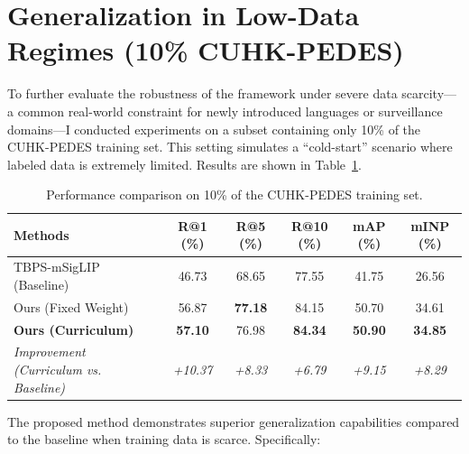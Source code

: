 \documentclass[../main.tex]{subfiles}
\begin{document}
\section{Generalization in Low-Data Regimes (10\% CUHK-PEDES)}

\noindent To further evaluate the robustness of the framework under severe data scarcity---a common real-world constraint for newly introduced languages or surveillance domains---I conducted experiments on a subset containing only 10\% of the CUHK-PEDES training set. This setting simulates a ``cold-start'' scenario where labeled data is extremely limited. Results are shown in Table~\ref{tab:comparison_10percent}.

\begin{table}[htbp]
\centering
\caption{Performance comparison on 10\% of the CUHK-PEDES training set.}
\label{tab:comparison_10percent}
\renewcommand{\arraystretch}{1.3}
\begin{tabularx}{\textwidth}{Xccccc}
\toprule
\textbf{Methods} & \textbf{R@1 (\%)} & \textbf{R@5 (\%)} & \textbf{R@10 (\%)} & \textbf{mAP (\%)} & \textbf{mINP (\%)} \\
\midrule
TBPS-mSigLIP (Baseline) & 46.73 & 68.65 & 77.55 & 41.75 & 26.56 \\
Ours (Fixed Weight) & 56.87 & \textbf{77.18} & 84.15 & 50.70 & 34.61 \\
\textbf{Ours (Curriculum)} & \textbf{57.10} & 76.98 & \textbf{84.34} & \textbf{50.90} & \textbf{34.85} \\
\midrule
\textit{Improvement (Curriculum vs. Baseline)} & \textit{+10.37} & \textit{+8.33} & \textit{+6.79} & \textit{+9.15} & \textit{+8.29} \\
\bottomrule
\end{tabularx}
\end{table}

\noindent The proposed method demonstrates superior generalization capabilities compared to the baseline when training data is scarce. Specifically:
\end{document}
